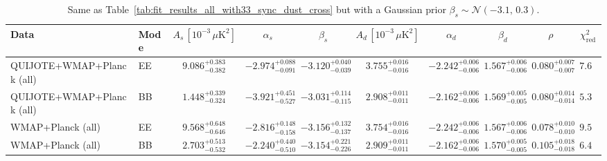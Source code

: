 \begin{table}[h]
\centering
\scriptsize
\setlength{\tabcolsep}{4pt}
\caption{Same as Table~\ref{tab:fit_results_all_with33_sync_dust_cross} but with a Gaussian prior $\beta_s \sim \mathcal{N}(-3.1,\,0.3)$.}
\label{tab:fit_results_all_with33_sync_dust_cross_prior_betas}
\begin{tabular}{llcccccccc}
\toprule
Data & Mode & $A_s\,[10^{-3}\,\mu\mathrm{K}^2]$ & $\alpha_s$ & $\beta_s$ & $A_d\,[10^{-3}\,\mu\mathrm{K}^2]$ & $\alpha_d$ & $\beta_d$ & $\rho$ & $\chi^2_\mathrm{red}$ \\
\midrule
QUIJOTE+WMAP+Planck (all) & EE & $9.086^{+0.383}_{-0.382}$ & $-2.974^{+0.088}_{-0.091}$ & $-3.120^{+0.040}_{-0.039}$ & $3.755^{+0.016}_{-0.016}$ & $-2.242^{+0.006}_{-0.006}$ & $1.567^{+0.006}_{-0.006}$ & $0.080^{+0.007}_{-0.007}$ & $7.62$ \\
QUIJOTE+WMAP+Planck (all) & BB & $1.448^{+0.339}_{-0.324}$ & $-3.921^{+0.451}_{-0.527}$ & $-3.031^{+0.114}_{-0.115}$ & $2.908^{+0.011}_{-0.011}$ & $-2.162^{+0.006}_{-0.006}$ & $1.569^{+0.005}_{-0.005}$ & $0.080^{+0.014}_{-0.014}$ & $5.31$ \\
WMAP+Planck (all) & EE & $9.568^{+0.648}_{-0.646}$ & $-2.816^{+0.148}_{-0.158}$ & $-3.156^{+0.132}_{-0.137}$ & $3.754^{+0.016}_{-0.016}$ & $-2.242^{+0.006}_{-0.006}$ & $1.567^{+0.006}_{-0.006}$ & $0.078^{+0.010}_{-0.010}$ & $9.56$ \\
WMAP+Planck (all) & BB & $2.703^{+0.513}_{-0.532}$ & $-2.240^{+0.440}_{-0.510}$ & $-3.154^{+0.221}_{-0.226}$ & $2.909^{+0.011}_{-0.011}$ & $-2.162^{+0.006}_{-0.006}$ & $1.570^{+0.005}_{-0.005}$ & $0.105^{+0.018}_{-0.018}$ & $6.41$ \\
\bottomrule
\end{tabular}
\end{table}
